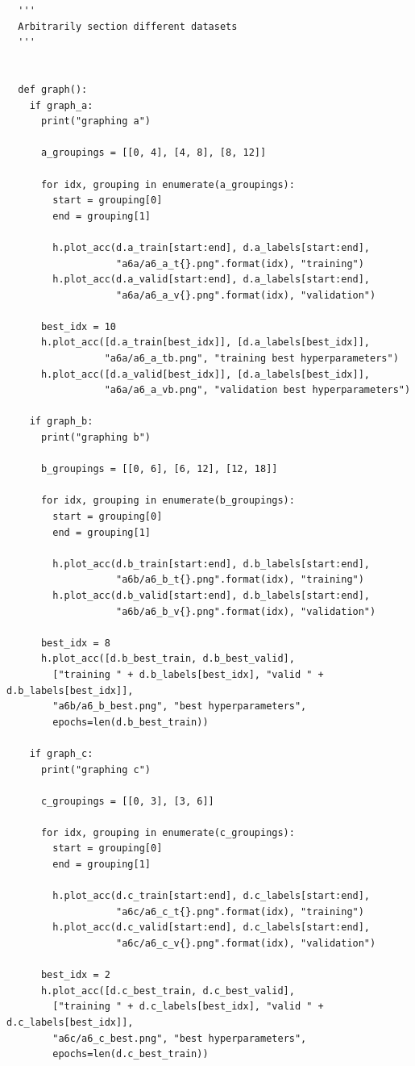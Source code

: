 \documentclass{article}
\newcommand{\1}{\mathbf{1}}
\begin{document}
{\begin{verbatim}
  '''
  Arbitrarily section different datasets
  '''
  
  
  def graph():
    if graph_a:
      print("graphing a")
      
      a_groupings = [[0, 4], [4, 8], [8, 12]]
      
      for idx, grouping in enumerate(a_groupings):
        start = grouping[0]
        end = grouping[1]
  
        h.plot_acc(d.a_train[start:end], d.a_labels[start:end],
                   "a6a/a6_a_t{}.png".format(idx), "training")
        h.plot_acc(d.a_valid[start:end], d.a_labels[start:end],
                   "a6a/a6_a_v{}.png".format(idx), "validation")
  
      best_idx = 10
      h.plot_acc([d.a_train[best_idx]], [d.a_labels[best_idx]],
                 "a6a/a6_a_tb.png", "training best hyperparameters")
      h.plot_acc([d.a_valid[best_idx]], [d.a_labels[best_idx]],
                 "a6a/a6_a_vb.png", "validation best hyperparameters")
  
    if graph_b:
      print("graphing b")
  
      b_groupings = [[0, 6], [6, 12], [12, 18]]
  
      for idx, grouping in enumerate(b_groupings):
        start = grouping[0]
        end = grouping[1]
  
        h.plot_acc(d.b_train[start:end], d.b_labels[start:end],
                   "a6b/a6_b_t{}.png".format(idx), "training")
        h.plot_acc(d.b_valid[start:end], d.b_labels[start:end],
                   "a6b/a6_b_v{}.png".format(idx), "validation")
  
      best_idx = 8
      h.plot_acc([d.b_best_train, d.b_best_valid],
        ["training " + d.b_labels[best_idx], "valid " + d.b_labels[best_idx]], 
        "a6b/a6_b_best.png", "best hyperparameters",
        epochs=len(d.b_best_train))
  
    if graph_c:
      print("graphing c")
  
      c_groupings = [[0, 3], [3, 6]]
  
      for idx, grouping in enumerate(c_groupings):
        start = grouping[0]
        end = grouping[1]
  
        h.plot_acc(d.c_train[start:end], d.c_labels[start:end],
                   "a6c/a6_c_t{}.png".format(idx), "training")
        h.plot_acc(d.c_valid[start:end], d.c_labels[start:end],
                   "a6c/a6_c_v{}.png".format(idx), "validation")
  
      best_idx = 2
      h.plot_acc([d.c_best_train, d.c_best_valid],
        ["training " + d.c_labels[best_idx], "valid " + d.c_labels[best_idx]],
        "a6c/a6_c_best.png", "best hyperparameters",
        epochs=len(d.c_best_train))
  

\end{verbatim}}
\end{document}
